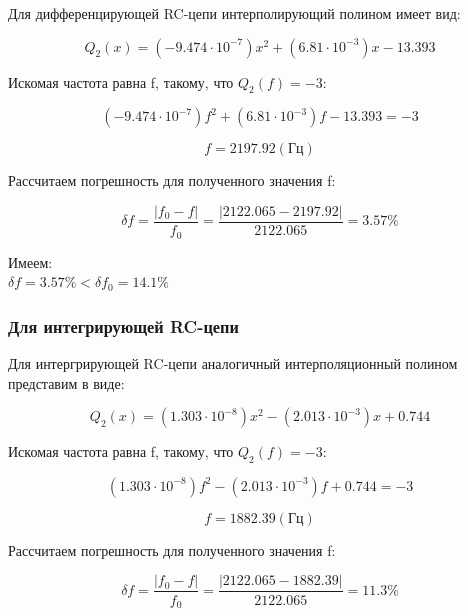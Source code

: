 Для дифференцирующей RC-цепи интерполирующий полином имеет вид:

\begin{equation}
Q_2(x) = (-9.474 \cdot 10^{-7})x^2 + (6.81 \cdot 10^{-3})x -13.393  
\end{equation}

Искомая частота равна f, такому, что $Q_2(f) = -3$:

\begin{equation}
(-9.474 \cdot 10^{-7})f^2 + (6.81 \cdot 10^{-3})f -13.393 = -3
\end{equation}

\begin{equation}
f = 2197.92 (\text{Гц})
\end{equation}

Рассчитаем погрешность для полученного значения f:

\begin{equation}
\delta f = \frac{|f_0 - f|}{f_0} = \frac{|2122.065 - 2197.92|}{2122.065} = 3.57 \% 
\end{equation}

Имеем:\\
$\delta f = 3.57 \% < \delta f_0 = 14.1\%$

\subsubsection{Для интегрирующей RC-цепи}
Для интергрирующей RC-цепи аналогичный интерполяционный полином представим в виде:

\begin{equation}
Q_2(x) = (1.303 \cdot 10^{-8})x^2 - (2.013 \cdot 10^{-3})x + 0.744
\end{equation}

Искомая частота равна f, такому, что $Q_2(f) = -3$:

\begin{equation}
(1.303 \cdot 10^{-8})f^2 - (2.013 \cdot 10^{-3})f + 0.744 = -3
\end{equation}

\begin{equation}
f = 1882.39 (\text{Гц})
\end{equation}

Рассчитаем погрешность для полученного значения f:

\begin{equation}
\delta f = \frac{|f_0 - f|}{f_0} = \frac{|2122.065 - 1882.39|}{2122.065} = 11.3 \% 
\end{equation}

